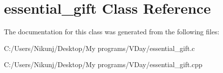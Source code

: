 \hypertarget{classessential__gift}{}\section{essential\+\_\+gift Class Reference}
\label{classessential__gift}


The documentation for this class was generated from the following files\+:\begin{DoxyCompactItemize}
\item 
C\+:/\+Users/\+Nikunj/\+Desktop/\+My programs/\+V\+Day/essential\+\_\+gift.\+c\item 
C\+:/\+Users/\+Nikunj/\+Desktop/\+My programs/\+V\+Day/essential\+\_\+gift.\+cpp\end{DoxyCompactItemize}
